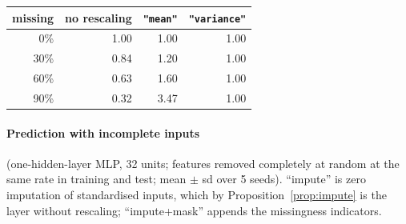 \documentclass[11pt,a4paper]{article}
\theoremstyle{definition}
\theoremstyle{remark}
\begin{document}
\begin{center}
\begin{tabular}{rrrr}
\toprule
missing & no rescaling & \texttt{"mean"} & \texttt{"variance"}\\
\midrule
0\% & 1.00 & 1.00 & 1.00\\
30\% & 0.84 & 1.20 & 1.00\\
60\% & 0.63 & 1.60 & 1.00\\
90\% & 0.32 & 3.47 & 1.00\\
\bottomrule
\end{tabular}
\end{center}

\paragraph{Prediction with incomplete inputs} (one-hidden-layer MLP, 32 units;
features removed completely at random at the same rate in training and test;
mean $\pm$ sd over 5 seeds). ``impute'' is zero imputation of standardised
inputs, which by Proposition~\ref{prop:impute} is the layer without rescaling;
``impute+mask'' appends the missingness indicators.
\end{document}
